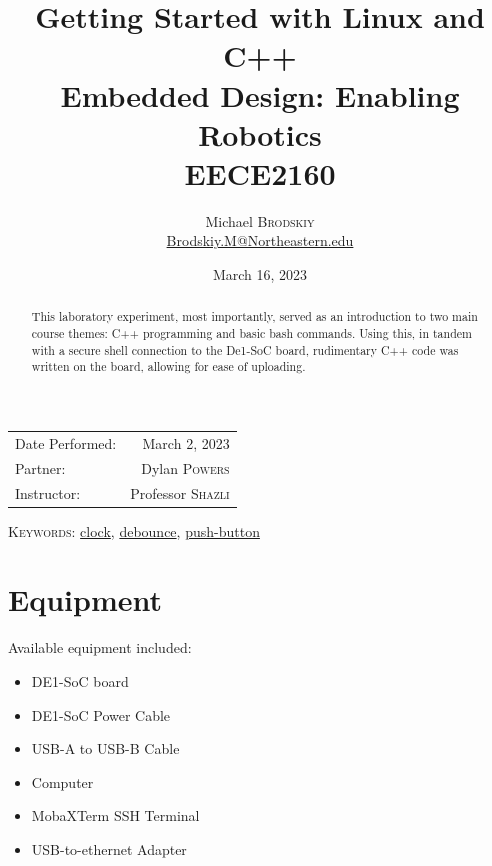 \documentclass[
	letterpaper, %
	10pt, %
]{CSUniSchoolLabReport}
\title{Getting Started with Linux and C++\\ Embedded Design: Enabling Robotics \\ EECE2160} %
\author{Michael \textsc{Brodskiy}\\ \small \href{mailto:Brodskiy.M@Northeastern.edu}{Brodskiy.M@Northeastern.edu}}
\date{March 16, 2023} %
\begin{document}
\maketitle %

\begin{center}
	\begin{tabular}{l r}
		Date Performed: & March 2, 2023 \\ %
        Partner: & Dylan \textsc{Powers} \\ %
		Instructor: & Professor \textsc{Shazli} %
	\end{tabular}
\end{center}

\newpage

\begin{abstract}

  This laboratory experiment, most importantly, served as an introduction to two main course themes: C++ programming and basic bash commands. Using this, in tandem with a secure shell connection to the De1-SoC board, rudimentary C++ code was written on the board, allowing for ease of uploading.

\end{abstract}

\begin{flushleft}

  \textsc{Keywords:} \underline{clock}, \underline{debounce}, \underline{push-button}

\end{flushleft}

\newpage

\section{Equipment}

\hspace{.5 in} Available equipment included:\\

\begin{itemize}

  \item DE1-SoC board

  \item DE1-SoC Power Cable

  \item USB-A to USB-B Cable

  \item Computer

  \item MobaXTerm SSH Terminal

  \item USB-to-ethernet Adapter

\end{itemize}
\end{document}
